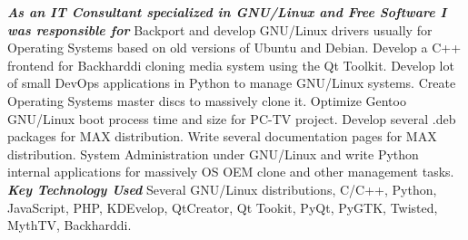\documentclass[11pt,a4paper,sans]{moderncv}
\begin{document}
{\begin{itemize}
\end{itemize}
{\bfseries \textit{As an IT Consultant specialized in GNU/Linux and Free Software I was responsible for}}\newline{}
Backport and develop GNU/Linux drivers usually for Operating Systems based on old versions of Ubuntu and Debian. Develop a C++ frontend for Backharddi cloning media system using the Qt Toolkit. Develop lot of small DevOps applications in Python to manage GNU/Linux systems. Create Operating Systems master discs to massively clone it. Optimize Gentoo GNU/Linux boot process time and size for PC-TV project. Develop several .deb packages for MAX distribution. Write several documentation pages for MAX distribution. System Administration under GNU/Linux and write Python internal applications for massively OS OEM clone and other management tasks.\newline{}
{\bfseries \textit{Key Technology Used}}\newline{}
Several GNU/Linux distributions, C/C++, Python, JavaScript, PHP, KDEvelop, QtCreator, Qt Tookit, PyQt, PyGTK, Twisted, MythTV, Backharddi.
}

\end{document}

